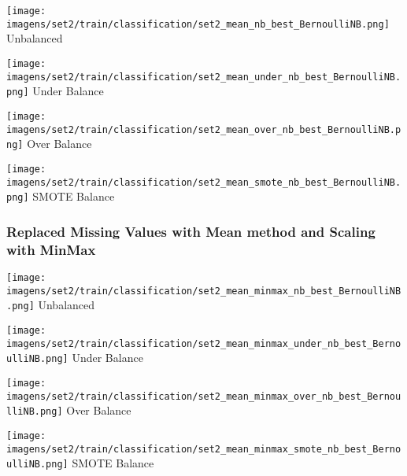 \documentclass[11pt]{article}
\begin{document}
\begin{figure*}[!htp]
    \begin{minipage}[!htp]{.25\textwidth}
        \centering
        \texttt{[image: imagens/set2/train/classification/set2\_mean\_nb\_best\_BernoulliNB.png]}
        Unbalanced
    \end{minipage}\hfill
    \begin{minipage}[!htp]{.25\textwidth}
        \centering
        \texttt{[image: imagens/set2/train/classification/set2\_mean\_under\_nb\_best\_BernoulliNB.png]}
        Under Balance
    \end{minipage}\hfill
    \begin{minipage}[!htp]{.25\textwidth}
        \centering
        \texttt{[image: imagens/set2/train/classification/set2\_mean\_over\_nb\_best\_BernoulliNB.png]}
        Over Balance
    \end{minipage}\hfill
    \begin{minipage}[!htp]{.25\textwidth}
        \centering
        \texttt{[image: imagens/set2/train/classification/set2\_mean\_smote\_nb\_best\_BernoulliNB.png]}
        SMOTE Balance
    \end{minipage}
\end{figure*}

\subsubsection*{Replaced Missing Values with Mean method and Scaling with MinMax}

\begin{figure*}[!htp]
    \begin{minipage}[!htp]{.25\textwidth}
        \centering
        \texttt{[image: imagens/set2/train/classification/set2\_mean\_minmax\_nb\_best\_BernoulliNB.png]}
        Unbalanced
    \end{minipage}\hfill
    \begin{minipage}[!htp]{.25\textwidth}
        \centering
        \texttt{[image: imagens/set2/train/classification/set2\_mean\_minmax\_under\_nb\_best\_BernoulliNB.png]}
        Under Balance
    \end{minipage}\hfill
    \begin{minipage}[!htp]{.25\textwidth}
        \centering
        \texttt{[image: imagens/set2/train/classification/set2\_mean\_minmax\_over\_nb\_best\_BernoulliNB.png]}
        Over Balance
    \end{minipage}\hfill
    \begin{minipage}[!htp]{.25\textwidth}
        \centering
        \texttt{[image: imagens/set2/train/classification/set2\_mean\_minmax\_smote\_nb\_best\_BernoulliNB.png]}
        SMOTE Balance
    \end{minipage}
\end{figure*}
\end{document}
